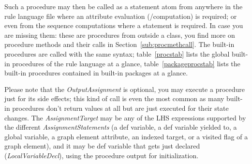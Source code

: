 Such a procedure may then be called as a statement atom from anywhere in the rule language file where an attribute evaluation (/computation) is required; or even from the sequence computations where a statement is required.
In case you are missing them: these are procedures from outside a class, you find more on procedure methods and their calls in Section~\ref{sub:procmethcall}.
The built-in procedures are called with the same syntax;
table~\ref{procstab} lists the global built-in procedures of the rule language at a glance,
table~\ref{packageprocstab} lists the built-in procedures contained in built-in packages at a glance.

Please note that the \emph{OutputAssignment} is optional, you may execute a procedure just for its side effects; this kind of call is even the most common as many built-in procedures don't return values at all but are just executed for their state changes.
The \emph{AssignmentTarget} may be any of the LHS expressions supported by the different \emph{AssignmentStatements} (a def variable, a def variable yielded to, a global variable, a graph element attribute, an indexed target, or a visited flag of a graph element), and it may be def variable that gets just declared (\emph{LocalVariableDecl}), using the procedure output for initialization.

